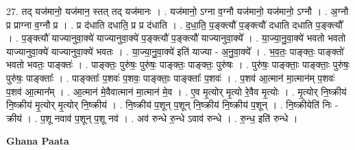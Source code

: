 \documentclass[17pt]{extarticle}
\begin{document}
27. तद् यज॑मानो॒ यज॑मान॒ स्तत् तद् यज॑मानः । . यज॑मानो॒ ऽग्ना व॒ग्नौ यज॑मानो॒ यज॑मानो॒ ऽग्नौ । . अ॒ग्नौ प्र प्राग्ना व॒ग्नौ प्र । . प्र द॑धाति दधाति॒ प्र प्र द॑धाति । . द॒धा॒ति॒ प॒ङ्क्त्यौ॑ प॒ङ्क्त्यौ॑ दधाति दधाति प॒ङ्क्त्यौ᳚ । . प॒ङ्क्त्यौ॑ याज्यानुवा॒क्ये॑ याज्यानुवा॒क्ये॑ प॒ङ्क्त्यौ॑ प॒ङ्क्त्यौ॑ याज्यानुवा॒क्ये᳚ । . या॒ज्या॒नु॒वा॒क्ये॑ भवतो भवतो याज्यानुवा॒क्ये॑ याज्यानुवा॒क्ये॑ भवतः । . या॒ज्या॒नु॒वा॒क्ये॑ इति॑ याज्या - अ॒नु॒वा॒क्ये᳚ । . भ॒व॒तः॒ पाङ्क्तः॒ पाङ्क्तो॑ भवतो भवतः॒ पाङ्क्तः॑ । . पाङ्क्तः॒ पुरु॑षः॒ पुरु॑षः॒ पाङ्क्तः॒ पाङ्क्तः॒ पुरु॑षः । . पुरु॑षः॒ पाङ्क्ताः॒ पाङ्क्ताः॒ पुरु॑षः॒ पुरु॑षः॒ पाङ्क्ताः᳚ । . पाङ्क्ताः᳚ प॒शवः॑ प॒शवः॒ पाङ्क्ताः॒ पाङ्क्ताः᳚ प॒शवः॑ । . प॒शव॑ आ॒त्मान॑ मा॒त्मान॑म् प॒शवः॑ प॒शव॑ आ॒त्मान᳚म् । . आ॒त्मान॑ मे॒वैवात्मान॑ मा॒त्मान॑ मे॒व । . ए॒व मृ॒त्योर् मृ॒त्यो रे॒वैव मृ॒त्योः । . मृ॒त्योर् नि॒ष्क्रीय॑ नि॒ष्क्रीय॑ मृ॒त्योर् मृ॒त्योर् नि॒ष्क्रीय॑ । . नि॒ष्क्रीय॑ प॒शून् प॒शून् नि॒ष्क्रीय॑ नि॒ष्क्रीय॑ प॒शून् । . नि॒ष्क्रीयेति॑ निः - क्रीय॑ । . प॒शू नवाव॑ प॒शून् प॒शू नव॑ । . अव॑ रुन्धे रु॒न्धे ऽवाव॑ रुन्धे । . रु॒न्ध॒ इति॑ रुन्धे । \newline

\textbf{Ghana Paata } \newline
\end{document}

